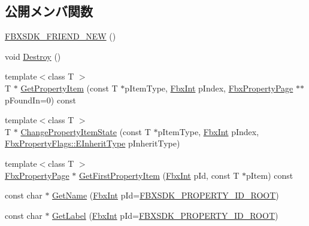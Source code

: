 \subsection*{公開メンバ関数}
\begin{DoxyCompactItemize}
\item 
\hyperlink{class_fbx_property_page_abb78155142e1cc255d2b2e74c8a262ff}{F\+B\+X\+S\+D\+K\+\_\+\+F\+R\+I\+E\+N\+D\+\_\+\+N\+EW} ()
\item 
void \hyperlink{class_fbx_property_page_a4c1d17d6237f93017d6171c575d59c7c}{Destroy} ()
\item 
{\footnotesize template$<$class T $>$ }\\T $\ast$ \hyperlink{class_fbx_property_page_a8a4190bff3b6acdc5adda7350cd0367d}{Get\+Property\+Item} (const T $\ast$p\+Item\+Type, \hyperlink{fbxtypes_8h_a088fa96de3b0b3ea69f0f6afef525dfb}{Fbx\+Int} p\+Index, \hyperlink{class_fbx_property_page}{Fbx\+Property\+Page} $\ast$$\ast$p\+Found\+In=0) const
\item 
{\footnotesize template$<$class T $>$ }\\T $\ast$ \hyperlink{class_fbx_property_page_af61ed9031e020731756e072e5632ce29}{Change\+Property\+Item\+State} (const T $\ast$p\+Item\+Type, \hyperlink{fbxtypes_8h_a088fa96de3b0b3ea69f0f6afef525dfb}{Fbx\+Int} p\+Index, \hyperlink{class_fbx_property_flags_ae3b667a4fcac4b827fa186a698fec2f8}{Fbx\+Property\+Flags\+::\+E\+Inherit\+Type} p\+Inherit\+Type)
\item 
{\footnotesize template$<$class T $>$ }\\\hyperlink{class_fbx_property_page}{Fbx\+Property\+Page} $\ast$ \hyperlink{class_fbx_property_page_a6fc00abe4ab09e4090417f4213071fe3}{Get\+First\+Property\+Item} (\hyperlink{fbxtypes_8h_a088fa96de3b0b3ea69f0f6afef525dfb}{Fbx\+Int} p\+Id, const T $\ast$p\+Item) const
\item 
const char $\ast$ \hyperlink{class_fbx_property_page_ab6d1f86f8f98eee0bb8f61a6c83e6ddb}{Get\+Name} (\hyperlink{fbxtypes_8h_a088fa96de3b0b3ea69f0f6afef525dfb}{Fbx\+Int} p\+Id=\hyperlink{fbxpropertydef_8h_a291bdb6d8428dce8463143fa3aba2c34}{F\+B\+X\+S\+D\+K\+\_\+\+P\+R\+O\+P\+E\+R\+T\+Y\+\_\+\+I\+D\+\_\+\+R\+O\+OT})
\item 
const char $\ast$ \hyperlink{class_fbx_property_page_a19982bc45519864d327b11f97b5324b0}{Get\+Label} (\hyperlink{fbxtypes_8h_a088fa96de3b0b3ea69f0f6afef525dfb}{Fbx\+Int} p\+Id=\hyperlink{fbxpropertydef_8h_a291bdb6d8428dce8463143fa3aba2c34}{F\+B\+X\+S\+D\+K\+\_\+\+P\+R\+O\+P\+E\+R\+T\+Y\+\_\+\+I\+D\+\_\+\+R\+O\+OT})
\item 
$$
\end{DoxyCompactItemize}
